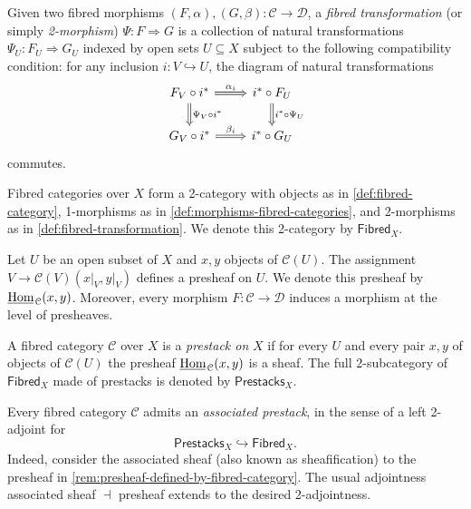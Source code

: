 \begin{definition}\label{def:fibred-transformation}
	Given two fibred morphisms $(F,\alpha),(G,\beta)\colon \mathcal{C} \to \mathcal{D}$, a \emph{fibred transformation} (or simply \textit{2-morphism}) $\Psi\colon F \Rightarrow G$ is a collection of natural transformations $\Psi_{U}\colon F_{U} \Rightarrow G_{U}$ indexed by open sets $U\subseteq X$ subject to the following compatibility condition: for any inclusion $i\colon V \hookrightarrow U$, the diagram of natural transformations 
	\begin{equation}\label{eqn:fibred-transformation-compatibility}
	\begin{tikzcd}
		F_{V} \circ i^{*} \ar[r, Rightarrow, "\alpha_{i}"] \ar[d, Rightarrow, "\Psi_{V} \circ i^{*}"] & i^{*} \circ F_{U} \ar[d, Rightarrow, "i^{*}\circ \Psi_{U}"] \\
		G_{V} \circ i^{*} \ar[r, Rightarrow, "\beta_{i}"] &  i^{*}\circ G_{U} 
	\end{tikzcd}
	\end{equation}
	commutes.
\end{definition}
\begin{remark}\label{rem:fibred-categories-form-a-2-category}
	Fibred categories over $X$ form a 2-category with objects as in \cref{def:fibred-category}, 1-morphisms as in \cref{def:morphisms-fibred-categories}, and 2-morphisms as in \cref{def:fibred-transformation}. We denote this 2-category by $\mathsf{Fibred}_{X}$.
\end{remark}
\begin{remark}\label{rem:presheaf-defined-by-fibred-category}
	Let $U$ be an open subset of $X$ and $x,y$ objects of $\mathcal{C}(U)$. The assignment $V \to \mathcal{C}(V)(x\lvert_{V}, y\lvert_{V})$ defines a presheaf on $U$. We denote this presheaf by $\uHom_{\mathcal{C}}(x,y)$. Moreover, every morphism $F\colon \mathcal{C} \to \mathcal{D}$ induces a morphism at the level of presheaves.
\end{remark}
\begin{definition}\label{def:prestack}
	A fibred category $\mathcal{C}$ over $X$ is a \textit{prestack on} $X$ if for every $U$ and every pair $x,y$ of objects of $\mathcal{C}(U)$ the presheaf $\uHom_{\mathcal{C}}(x,y)$ is a sheaf. The full 2-subcategory of $\mathsf{Fibred}_{X}$ made of prestacks is denoted by $\mathsf{Prestacks}_{X}$.
\end{definition}
\begin{remark}\label{rem:associated-prestack-of-a-fibred-category}
	Every fibred category $\mathcal{C}$ admits an \textit{associated prestack}, in the sense of a left 2-adjoint for
	\[
		\mathsf{Prestacks}_{X} \hookrightarrow \mathsf{Fibred}_{X}.
	\]
	Indeed, consider the associated sheaf (also known as sheafification) to the presheaf in \cref{rem:presheaf-defined-by-fibred-category}. The usual adjointness associated sheaf $\dashv$ presheaf extends to the desired 2-adjointness. 
\end{remark}
